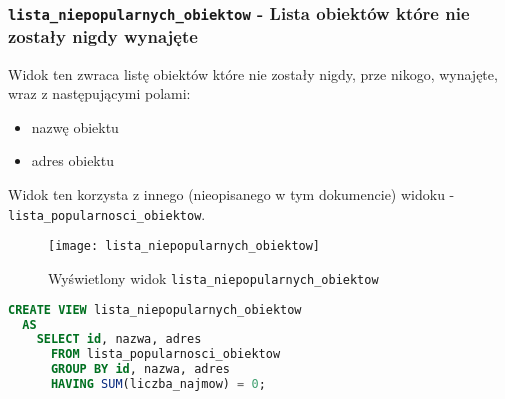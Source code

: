 \subsubsection{\texttt{lista\_niepopularnych\_obiektow} - Lista obiektów które nie zostały nigdy wynajęte}

Widok ten zwraca listę obiektów które nie zostały nigdy, prze nikogo, wynajęte, wraz z następującymi polami:
\begin{itemize}
	\item nazwę obiektu
	\item adres obiektu
\end{itemize}

Widok ten korzysta z innego (nieopisanego w tym dokumencie) widoku - \texttt{lista\_popularnosci\_obiektow}.

\begin{figure}[h]
	\centering
    \texttt{[image: lista\_niepopularnych\_obiektow]}
	\caption{Wyświetlony widok \texttt{lista\_niepopularnych\_obiektow}}
	\label{fig:lista_niepopularnych_obiektow}
\end{figure}

\begin{lstlisting}[language=SQL, caption={Skrypt tworzący widok \texttt{lista\_niepopularnych\_obiektow}}, label={lst:view-lista_niepopularnych_obiektow}]
CREATE VIEW lista_niepopularnych_obiektow
  AS
    SELECT id, nazwa, adres
      FROM lista_popularnosci_obiektow
      GROUP BY id, nazwa, adres
      HAVING SUM(liczba_najmow) = 0;
\end{lstlisting}